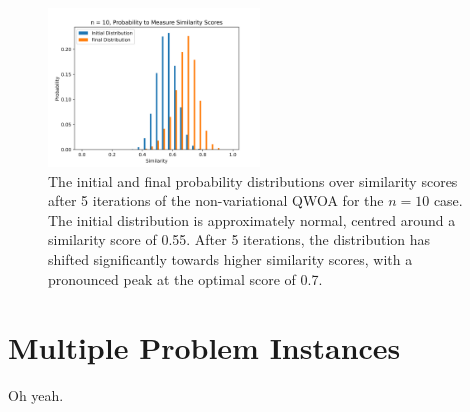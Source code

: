 \begin{figure}
\centering
\includegraphics[width=0.5\textwidth]{Figs/n=10_Similarity_scores.png}
\caption{The initial and final probability distributions over similarity scores after 5 iterations of the non-variational QWOA for the $n=10$ case. The initial distribution is approximately normal, centred around a similarity score of 0.55. After 5 iterations, the distribution has shifted significantly towards higher similarity scores, with a pronounced peak at the optimal score of 0.7.}
\label{fig:similarity_scores}
\end{figure}

\section{Multiple Problem Instances}

Oh yeah.